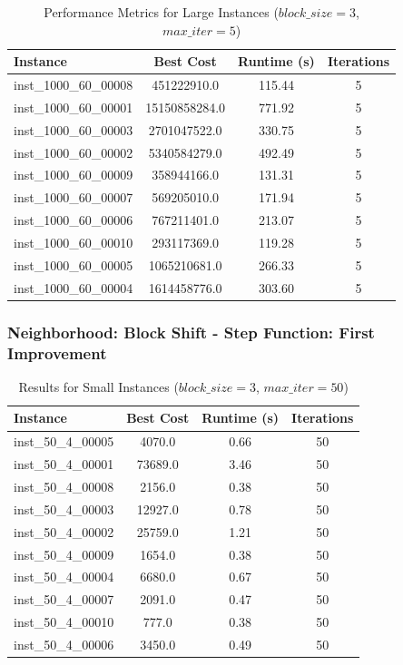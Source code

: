 \documentclass{article}
\begin{document}
\begin{table}[H]
\centering
\caption{Performance Metrics for Large Instances ($block\_size=3$, $max\_iter=5$)}
\begin{tabular}{lccc}
\toprule
\textbf{Instance} & \textbf{Best Cost} & \textbf{Runtime (s)} & \textbf{Iterations} \\
\midrule
inst\_1000\_60\_00008 & 451222910.0  & 115.44 & 5 \\
inst\_1000\_60\_00001 & 15150858284.0  & 771.92 & 5 \\
inst\_1000\_60\_00003 & 2701047522.0  & 330.75 & 5 \\
inst\_1000\_60\_00002 & 5340584279.0  & 492.49 & 5 \\
inst\_1000\_60\_00009 & 358944166.0  & 131.31 & 5 \\
inst\_1000\_60\_00007 & 569205010.0  & 171.94 & 5 \\
inst\_1000\_60\_00006 & 767211401.0  & 213.07 & 5 \\
inst\_1000\_60\_00010 & 293117369.0  & 119.28 & 5 \\
inst\_1000\_60\_00005 & 1065210681.0  & 266.33 & 5 \\
inst\_1000\_60\_00004 & 1614458776.0  & 303.60 & 5 \\
\bottomrule
\end{tabular}
\label{tab:performance_metrics_1000_60}
\end{table}

\subsubsection*{Neighborhood: Block Shift - Step Function: First Improvement}

\begin{table}[H]
\centering
\caption{Results for Small Instances ($block\_size=3$, $max\_iter=50$)}
\begin{tabular}{lccc}
\toprule
\textbf{Instance} & \textbf{Best Cost} & \textbf{Runtime (s)} & \textbf{Iterations} \\
\midrule
inst\_50\_4\_00005 & 4070.0  & 0.66 & 50 \\
inst\_50\_4\_00001 & 73689.0 & 3.46 & 50 \\
inst\_50\_4\_00008 & 2156.0  & 0.38 & 50 \\
inst\_50\_4\_00003 & 12927.0 & 0.78 & 50 \\
inst\_50\_4\_00002 & 25759.0 & 1.21 & 50 \\
inst\_50\_4\_00009 & 1654.0  & 0.38 & 50 \\
inst\_50\_4\_00004 & 6680.0  & 0.67 & 50 \\
inst\_50\_4\_00007 & 2091.0  & 0.47 & 50 \\
inst\_50\_4\_00010 & 777.0   & 0.38 & 50 \\
inst\_50\_4\_00006 & 3450.0  & 0.49 & 50 \\
\bottomrule
\end{tabular}
\label{tab:results_50_4}
\end{table}
\end{document}
